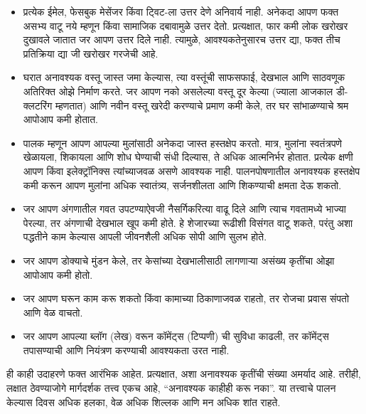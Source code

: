 \begin{itemize}
 \item प्रत्येक ईमेल, फेसबुक मेसेंजर किंवा ट्विट-ला उत्तर देणे अनिवार्य नाही. अनेकदा आपण फक्त असभ्य वाटू नये म्हणून किंवा सामाजिक दबावामुळे उत्तर देतो. प्रत्यक्षात, फार कमी लोक खरोखर दुखावले जातात जर आपण उत्तर दिले नाही. त्यामुळे, आवश्यकतेनुसारच उत्तर द्या, फक्त तीच प्रतिक्रिया द्या जी खरोखर गरजेची आहे.
\item घरात अनावश्यक वस्तू जास्त जमा केल्यास, त्या वस्तूंची साफसफाई, देखभाल आणि साठवणूक अतिरिक्त ओझे निर्माण करते. जर आपण नको असलेल्या वस्तू दूर केल्या (ज्याला आजकाल डी-क्लटरिंग म्हणतात) आणि नवीन वस्तू खरेदी करण्याचे प्रमाण कमी केले, तर घर सांभाळण्याचे श्रम आपोआप कमी होतात.
\item पालक म्हणून आपण आपल्या मुलांसाठी अनेकदा जास्त हस्तक्षेप करतो. मात्र, मुलांना स्वतंत्रपणे खेळायला, शिकायला आणि शोध घेण्याची संधी दिल्यास, ते अधिक आत्मनिर्भर होतात. प्रत्येक क्षणी आपण किंवा इलेक्ट्रॉनिक्स त्यांच्याजवळ असणे आवश्यक नाही. पालनपोषणातील अनावश्यक हस्तक्षेप कमी करून आपण मुलांना अधिक स्वातंत्र्य, सर्जनशीलता आणि शिकण्याची क्षमता देऊ शकतो.
\item जर आपण अंगणातील गवत उपटण्याऐवजी नैसर्गिकरित्या वाढू दिले आणि त्याच गवतामध्ये भाज्या पेरल्या, तर अंगणाची देखभाल खूप कमी होते. हे शेजारच्या रूढीशी विसंगत वाटू शकते, परंतु अशा पद्धतीने काम केल्यास आपली जीवनशैली अधिक सोपी आणि सुलभ होते.
\item जर आपण डोक्याचे मुंडन केले, तर केसांच्या देखभालीसाठी लागणाऱ्या असंख्य कृतींचा ओझा आपोआप कमी होतो.
\item जर आपण घरून काम करू शकतो किंवा कामाच्या ठिकाणाजवळ राहतो, तर रोजचा प्रवास संपतो आणि वेळ वाचतो.
\item जर आपण आपल्या ब्लॉग (लेख) वरून कॉमेंट्स (टिप्पणी) ची सुविधा काढली, तर कॉमेंट्स तपासण्याची आणि नियंत्रण करण्याची आवश्यकता उरत नाही.
\end{itemize}
ही काही उदाहरणे फक्त आरंभिक आहेत. प्रत्यक्षात, अशा अनावश्यक कृतींची संख्या अमर्याद आहे. तरीही, लक्षात ठेवण्याजोगे मार्गदर्शक तत्त्व एकच आहे, “अनावश्यक काहीही करू नका”. या तत्त्वाचे पालन केल्यास दिवस अधिक हलका, वेळ अधिक शिल्लक आणि मन अधिक शांत राहते.

